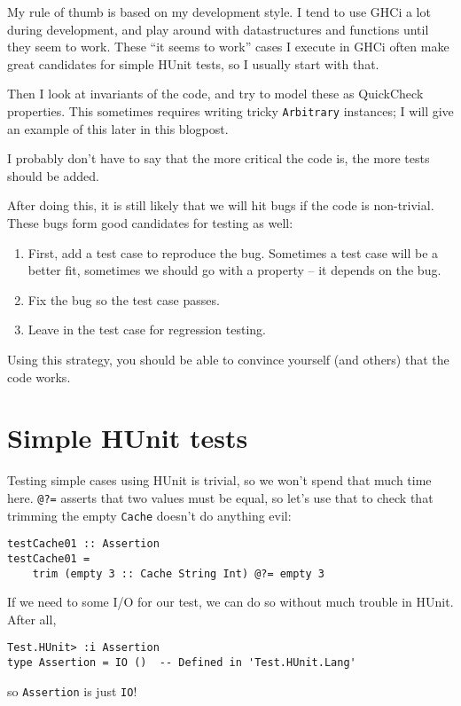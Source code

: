 My rule of thumb is based on my development style. I tend to use GHCi a lot during development, and play around with datastructures and functions until they seem to work. These ``it seems to work'' cases I execute in GHCi often make great candidates for simple HUnit tests, so I usually start with that.

Then I look at invariants of the code, and try to model these as QuickCheck properties. This sometimes requires writing tricky \texttt{Arbitrary} instances; I will give an example of this later in this blogpost.

I probably don't have to say that the more critical the code is, the more tests should be added.

After doing this, it is still likely that we will hit bugs if the code is non-trivial. These bugs form good candidates for testing as well:

\begin{enumerate}
\item First, add a test case to reproduce the bug. Sometimes a test case will be a better fit, sometimes we should go with a property -- it depends on the bug.
\item Fix the bug so the test case passes.
\item Leave in the test case for regression testing.
\end{enumerate}
Using this strategy, you should be able to convince yourself (and others) that the code works.

\section{Simple HUnit tests}


Testing simple cases using HUnit is trivial, so we won't spend that much time here. \texttt{@?=} asserts that two values must be equal, so let's use that to check that trimming the empty \texttt{Cache} doesn't do anything evil:

\begin{verbatim}
testCache01 :: Assertion
testCache01 =
    trim (empty 3 :: Cache String Int) @?= empty 3
\end{verbatim}
If we need to some I/O for our test, we can do so without much trouble in HUnit. After all,

\begin{verbatim}
Test.HUnit> :i Assertion
type Assertion = IO ()  -- Defined in 'Test.HUnit.Lang'
\end{verbatim}
so \texttt{Assertion} is just \texttt{IO}!


